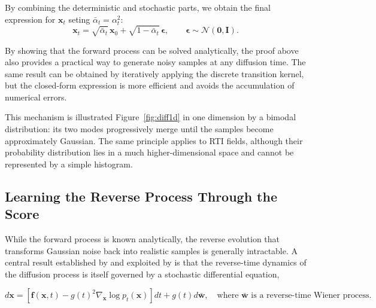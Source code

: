 \documentclass[11pt,a4paper]{article}
\begin{document}
\begin{compactproof}[title={Proof}]
 By combining the deterministic and stochastic parts, we obtain the final expression for $\mathbf{x}_t$ seting $\bar{\alpha}_t = \alpha_t^2$:
\begin{equation*}
\boxed{
    \mathbf{x}_t
    =
    \sqrt{\bar{\alpha}_t}\,\mathbf{x}_0
    +
    \sqrt{1-\bar{\alpha}_t}\,\boldsymbol{\epsilon},
    \qquad
    \boldsymbol{\epsilon}\sim\mathcal{N}(\mathbf{0},\mathbf{I}).
}
\end{equation*}
\qedcompact
\end{compactproof}

By showing that the forward process can be solved analytically, the proof above also provides a practical way to generate noisy samples at any diffusion time. The same result can be obtained by iteratively applying the discrete transition kernel, but the closed-form expression is more efficient and avoids the accumulation of numerical errors.

This mechanism is illustrated Figure~\ref{fig:diff1d} in
one dimension by a bimodal distribution: its two modes progressively
merge until the samples become approximately Gaussian. The same principle
applies to RTI fields, although their probability distribution lies in a much
higher-dimensional space and cannot be represented by a simple histogram.


\subsection{Learning the Reverse Process Through the Score}

While the forward process is known analytically, the reverse evolution that transforms Gaussian noise back into realistic samples is generally intractable. A central result established by and exploited by is that the reverse-time dynamics of the diffusion process is itself governed by a stochastic differential equation,

\begin{equation}
d\mathbf{x}
=
\left[
\mathbf{f}(\mathbf{x},t)
-
g(t)^2
\nabla_{\mathbf{x}}
\log p_t(\mathbf{x})
\right]dt
+
g(t)d\bar{\mathbf{w}}, \quad {\scriptstyle \text{where $\bar{\mathbf{w}}$ is a reverse-time Wiener process.}}
\end{equation}
\end{document}

